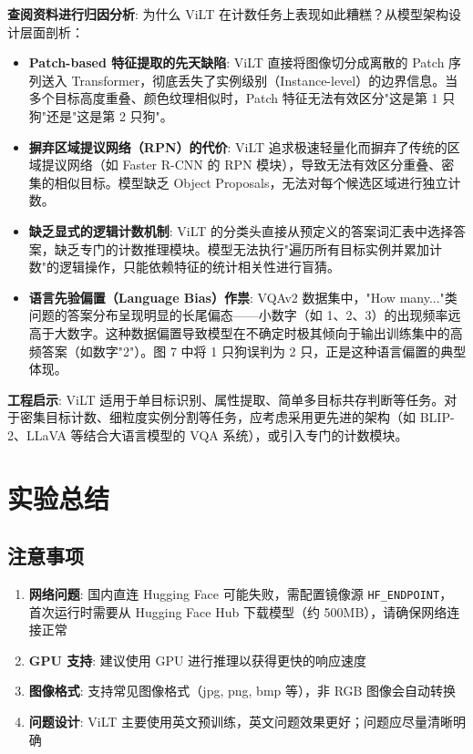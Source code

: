 \documentclass[a4paper]{article}
\begin{document}
\textbf{查阅资料进行归因分析}: 为什么 ViLT 在计数任务上表现如此糟糕？从模型架构设计层面剖析：

\begin{itemize}
    \item \textbf{Patch-based 特征提取的先天缺陷}: ViLT 直接将图像切分成离散的 Patch 序列送入 Transformer，彻底丢失了实例级别（Instance-level）的边界信息。当多个目标高度重叠、颜色纹理相似时，Patch 特征无法有效区分"这是第 1 只狗"还是"这是第 2 只狗"。
    
    \item \textbf{摒弃区域提议网络（RPN）的代价}: ViLT 追求极速轻量化而摒弃了传统的区域提议网络（如 Faster R-CNN 的 RPN 模块），导致无法有效区分重叠、密集的相似目标。模型缺乏 Object Proposals，无法对每个候选区域进行独立计数。
    
    \item \textbf{缺乏显式的逻辑计数机制}: ViLT 的分类头直接从预定义的答案词汇表中选择答案，缺乏专门的计数推理模块。模型无法执行"遍历所有目标实例并累加计数"的逻辑操作，只能依赖特征的统计相关性进行盲猜。
    
    \item \textbf{语言先验偏置（Language Bias）作祟}: VQAv2 数据集中，"How many..."类问题的答案分布呈现明显的长尾偏态——小数字（如 1、2、3）的出现频率远高于大数字。这种数据偏置导致模型在不确定时极其倾向于输出训练集中的高频答案（如数字"2"）。图 7 中将 1 只狗误判为 2 只，正是这种语言偏置的典型体现。
\end{itemize}

\textbf{工程启示}: ViLT 适用于单目标识别、属性提取、简单多目标共存判断等任务。对于密集目标计数、细粒度实例分割等任务，应考虑采用更先进的架构（如 BLIP-2、LLaVA 等结合大语言模型的 VQA 系统），或引入专门的计数模块。

\section{实验总结}

\subsection{注意事项}

\begin{enumerate}
    \item \textbf{网络问题}: 国内直连 Hugging Face 可能失败，需配置镜像源 \texttt{HF\_ENDPOINT}， 首次运行时需要从 Hugging Face Hub 下载模型（约 500MB），请确保网络连接正常
    \item \textbf{GPU 支持}: 建议使用 GPU 进行推理以获得更快的响应速度
    \item \textbf{图像格式}: 支持常见图像格式（jpg, png, bmp 等），非 RGB 图像会自动转换
    \item \textbf{问题设计}: ViLT 主要使用英文预训练，英文问题效果更好；问题应尽量清晰明确
\end{enumerate}
\end{document}
